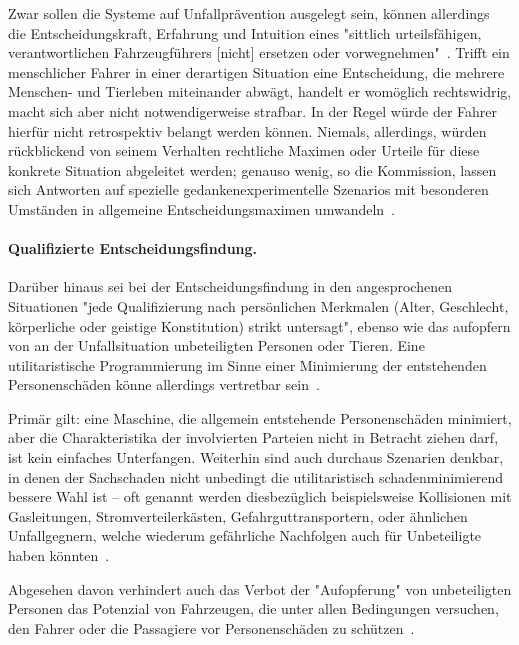 \documentclass[twocolumn, german]{tum-article}
\begin{document}
Zwar sollen die Systeme auf Unfallprävention ausgelegt sein, können allerdings die Entscheidungskraft, Erfahrung und Intuition eines "sittlich urteilsfähigen, verantwortlichen Fahrzeugführers [nicht] ersetzen oder vorwegnehmen"~\cite[S. 11]{ethik-komission}.
Trifft ein menschlicher Fahrer in einer derartigen Situation eine Entscheidung, die mehrere Menschen- und Tierleben miteinander abwägt, handelt er womöglich rechtswidrig, macht sich aber nicht notwendigerweise strafbar.
In der Regel würde der Fahrer hierfür nicht retrospektiv belangt werden können.
Niemals, allerdings, würden rückblickend von seinem Verhalten rechtliche Maximen oder Urteile für diese konkrete Situation abgeleitet werden;
genauso wenig, so die Kommission, lassen sich Antworten auf spezielle gedankenexperimentelle Szenarios mit besonderen Umständen in allgemeine Entscheidungsmaximen umwandeln~\cite[S. 11]{ethik-komission}.

\paragraph{Qualifizierte Entscheidungsfindung.}
Darüber hinaus sei bei der Entscheidungsfindung in den angesprochenen Situationen "jede Qualifizierung nach persönlichen Merkmalen (Alter, Geschlecht, körperliche oder geistige Konstitution) strikt untersagt", ebenso wie das aufopfern von an der Unfallsituation unbeteiligten Personen oder Tieren.
Eine utilitaristische Programmierung im Sinne einer Minimierung der entstehenden Personenschäden könne allerdings vertretbar sein~\cite[S. 11]{ethik-komission}.

Primär gilt: eine Maschine, die allgemein entstehende Personenschäden minimiert, aber die Charakteristika der involvierten Parteien nicht in Betracht ziehen darf, ist kein einfaches Unterfangen.
Weiterhin sind auch durchaus Szenarien denkbar, in denen der Sachschaden nicht unbedingt die utilitaristisch schadenminimierend bessere Wahl ist -- oft genannt werden diesbezüglich beispielsweise Kollisionen mit Gasleitungen, Stromverteilerkästen, Gefahrguttransportern, oder ähnlichen Unfallgegnern, welche wiederum gefährliche Nachfolgen auch für Unbeteiligte haben könnten~\cite[S. 552f.]{ethics-code}.

Abgesehen davon verhindert auch das Verbot der "Aufopferung" von unbeteiligten Personen das Potenzial von Fahrzeugen, die unter allen Bedingungen versuchen, den Fahrer oder die Passagiere vor Personenschäden zu schützen~\cite[S. 553]{ethics-code}.
\end{document}
